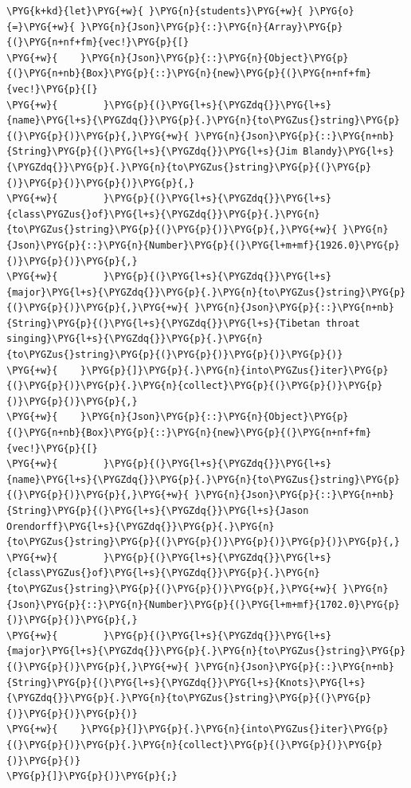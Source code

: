 \begin{Verbatim}[commandchars=\\\{\},breaklines=true,breakanywhere=true,fontsize=\codefont,xleftmargin=17bp]
\PYG{k+kd}{let}\PYG{+w}{ }\PYG{n}{students}\PYG{+w}{ }\PYG{o}{=}\PYG{+w}{ }\PYG{n}{Json}\PYG{p}{::}\PYG{n}{Array}\PYG{p}{(}\PYG{n+nf+fm}{vec!}\PYG{p}{[}
\PYG{+w}{    }\PYG{n}{Json}\PYG{p}{::}\PYG{n}{Object}\PYG{p}{(}\PYG{n+nb}{Box}\PYG{p}{::}\PYG{n}{new}\PYG{p}{(}\PYG{n+nf+fm}{vec!}\PYG{p}{[}
\PYG{+w}{        }\PYG{p}{(}\PYG{l+s}{\PYGZdq{}}\PYG{l+s}{name}\PYG{l+s}{\PYGZdq{}}\PYG{p}{.}\PYG{n}{to\PYGZus{}string}\PYG{p}{(}\PYG{p}{)}\PYG{p}{,}\PYG{+w}{ }\PYG{n}{Json}\PYG{p}{::}\PYG{n+nb}{String}\PYG{p}{(}\PYG{l+s}{\PYGZdq{}}\PYG{l+s}{Jim Blandy}\PYG{l+s}{\PYGZdq{}}\PYG{p}{.}\PYG{n}{to\PYGZus{}string}\PYG{p}{(}\PYG{p}{)}\PYG{p}{)}\PYG{p}{)}\PYG{p}{,}
\PYG{+w}{        }\PYG{p}{(}\PYG{l+s}{\PYGZdq{}}\PYG{l+s}{class\PYGZus{}of}\PYG{l+s}{\PYGZdq{}}\PYG{p}{.}\PYG{n}{to\PYGZus{}string}\PYG{p}{(}\PYG{p}{)}\PYG{p}{,}\PYG{+w}{ }\PYG{n}{Json}\PYG{p}{::}\PYG{n}{Number}\PYG{p}{(}\PYG{l+m+mf}{1926.0}\PYG{p}{)}\PYG{p}{)}\PYG{p}{,}
\PYG{+w}{        }\PYG{p}{(}\PYG{l+s}{\PYGZdq{}}\PYG{l+s}{major}\PYG{l+s}{\PYGZdq{}}\PYG{p}{.}\PYG{n}{to\PYGZus{}string}\PYG{p}{(}\PYG{p}{)}\PYG{p}{,}\PYG{+w}{ }\PYG{n}{Json}\PYG{p}{::}\PYG{n+nb}{String}\PYG{p}{(}\PYG{l+s}{\PYGZdq{}}\PYG{l+s}{Tibetan throat singing}\PYG{l+s}{\PYGZdq{}}\PYG{p}{.}\PYG{n}{to\PYGZus{}string}\PYG{p}{(}\PYG{p}{)}\PYG{p}{)}\PYG{p}{)}
\PYG{+w}{    }\PYG{p}{]}\PYG{p}{.}\PYG{n}{into\PYGZus{}iter}\PYG{p}{(}\PYG{p}{)}\PYG{p}{.}\PYG{n}{collect}\PYG{p}{(}\PYG{p}{)}\PYG{p}{)}\PYG{p}{)}\PYG{p}{,}
\PYG{+w}{    }\PYG{n}{Json}\PYG{p}{::}\PYG{n}{Object}\PYG{p}{(}\PYG{n+nb}{Box}\PYG{p}{::}\PYG{n}{new}\PYG{p}{(}\PYG{n+nf+fm}{vec!}\PYG{p}{[}
\PYG{+w}{        }\PYG{p}{(}\PYG{l+s}{\PYGZdq{}}\PYG{l+s}{name}\PYG{l+s}{\PYGZdq{}}\PYG{p}{.}\PYG{n}{to\PYGZus{}string}\PYG{p}{(}\PYG{p}{)}\PYG{p}{,}\PYG{+w}{ }\PYG{n}{Json}\PYG{p}{::}\PYG{n+nb}{String}\PYG{p}{(}\PYG{l+s}{\PYGZdq{}}\PYG{l+s}{Jason Orendorff}\PYG{l+s}{\PYGZdq{}}\PYG{p}{.}\PYG{n}{to\PYGZus{}string}\PYG{p}{(}\PYG{p}{)}\PYG{p}{)}\PYG{p}{)}\PYG{p}{,}
\PYG{+w}{        }\PYG{p}{(}\PYG{l+s}{\PYGZdq{}}\PYG{l+s}{class\PYGZus{}of}\PYG{l+s}{\PYGZdq{}}\PYG{p}{.}\PYG{n}{to\PYGZus{}string}\PYG{p}{(}\PYG{p}{)}\PYG{p}{,}\PYG{+w}{ }\PYG{n}{Json}\PYG{p}{::}\PYG{n}{Number}\PYG{p}{(}\PYG{l+m+mf}{1702.0}\PYG{p}{)}\PYG{p}{)}\PYG{p}{,}
\PYG{+w}{        }\PYG{p}{(}\PYG{l+s}{\PYGZdq{}}\PYG{l+s}{major}\PYG{l+s}{\PYGZdq{}}\PYG{p}{.}\PYG{n}{to\PYGZus{}string}\PYG{p}{(}\PYG{p}{)}\PYG{p}{,}\PYG{+w}{ }\PYG{n}{Json}\PYG{p}{::}\PYG{n+nb}{String}\PYG{p}{(}\PYG{l+s}{\PYGZdq{}}\PYG{l+s}{Knots}\PYG{l+s}{\PYGZdq{}}\PYG{p}{.}\PYG{n}{to\PYGZus{}string}\PYG{p}{(}\PYG{p}{)}\PYG{p}{)}\PYG{p}{)}
\PYG{+w}{    }\PYG{p}{]}\PYG{p}{.}\PYG{n}{into\PYGZus{}iter}\PYG{p}{(}\PYG{p}{)}\PYG{p}{.}\PYG{n}{collect}\PYG{p}{(}\PYG{p}{)}\PYG{p}{)}\PYG{p}{)}
\PYG{p}{]}\PYG{p}{)}\PYG{p}{;}
\end{Verbatim}

